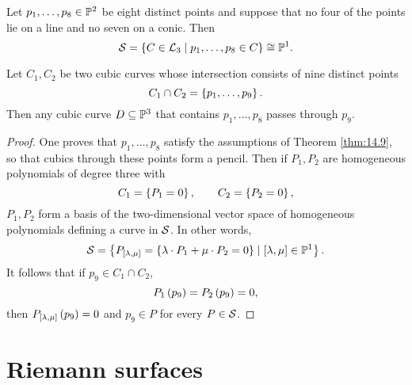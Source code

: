\begin{proposition}
Let $ p_1, \dots, p_8 \in \P^2 $ be eight distinct points and suppose that no four of the points lie on a line and no seven on a conic. Then
$$ \SS = \cb{C \in \LL_3 \mid p_1, \dots, p_8 \in C} \cong \P^1. $$
\end{proposition}

\begin{corollary}
Let $ C_1, C_2 $ be two cubic curves whose intersection consists of nine distinct points
$$ C_1 \cap C_2 = \cb{p_1, \dots, p_9}. $$
Then any cubic curve $ D \subseteq \P^3 $ that contains $ p_1, \dots, p_8 $ passes through $ p_9 $.
\end{corollary}

\begin{proof}
One proves that $ p_1, \dots, p_8 $ satisfy the assumptions of Theorem \ref{thm:14.9}, so that cubics through these points form a pencil. Then if $ P_1, P_2 $ are homogeneous polynomials of degree three with
$$ C_1 = \cb{P_1 = 0}, \qquad C_2 = \cb{P_2 = 0}, $$
$ P_1, P_2 $ form a basis of the two-dimensional vector space of homogeneous polynomials defining a curve in $ \SS $. In other words,
$$ \SS = \cb{P_{\sb{\lambda, \mu}} = \cb{\lambda \cdot P_1 + \mu \cdot P_2 = 0} \mid \sb{\lambda, \mu} \in \P^1}. $$
It follows that if $ p_9 \in C_1 \cap C_2 $,
$$ P_1\rb{p_9} = P_2\rb{p_9} = 0, $$
then $ P_{\sb{\lambda, \mu}}\rb{p_9} = 0 $ and $ p_9 \in P $ for every $ P \in \SS $.
\end{proof}

\pagebreak

\section{Riemann surfaces}

